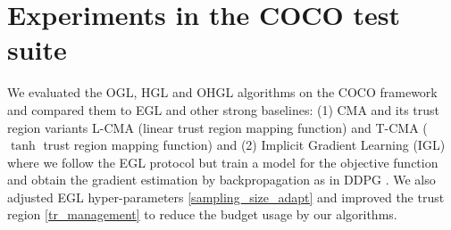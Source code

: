 \section{Experiments in the COCO test suite} \label{experiment}







We evaluated the OGL, HGL and OHGL algorithms on the COCO framework \cite{hansen2021coco} and compared them to EGL and other strong baselines: (1) CMA and its trust region variants L-CMA (linear trust region mapping function) and T-CMA ($\tanh$ trust region mapping function) and (2) Implicit Gradient Learning (IGL) \cite{sarafian2020explicit} where we follow the EGL protocol but train a model for the objective function and obtain the gradient estimation by backpropagation as in DDPG \cite{lillicrap2015continuous}. We also adjusted EGL hyper-parameters \ref{sampling_size_adapt} and improved the trust region \ref{tr_management} to reduce the budget usage by our algorithms.

